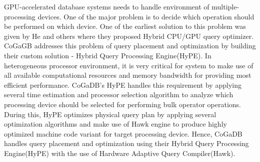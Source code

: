GPU-accelerated database systems needs to handle environment of multiple-processing devices. One of the major problem is to decide which operation should be performed on which device. One of the earliest solution to this problem was given by He and others where they proposed Hybrid CPU/GPU query optimizer\cite{cogadb_relational_query}. CoGaGB addresses this problem of query placement and optimization by building their custom solution - Hybrid Query Processing Engine(HyPE).
\newline
In heterogeneous processor environment, it is very critical for system to make use of all available computational resources and memory bandwidth for providing most efficient performance. CoGaDB's HyPE handles this requirement by applying several time estimation and processor selection algorithm to analyze which processing device should be selected for performing bulk operator operations. During this, HyPE optimizes physical query plan by applying several optimization algorithms and make use of Hawk engine to produce highly optimized machine code variant for target processing device. Hence, CoGaDB handles query placement and optimization using their Hybrid Query Processing Engine(HyPE) with the use of Hardware Adaptive Query Compiler(Hawk).